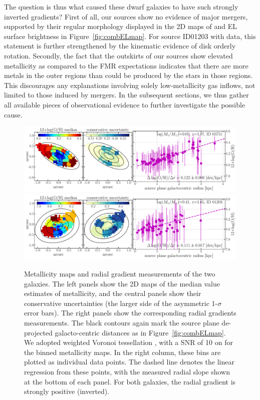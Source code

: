 The question is thus what caused these dwarf galaxies to have such strongly inverted gradients?
First of all, our sources show no evidence of major mergers, supported by their regular morphology displayed in the 2D maps of 
\Mstar and EL surface brightness in Figure~\ref{fig:combELmap}.
For source ID01203 with \osiris data, this statement is further strengthened by the kinematic evidence of disk orderly rotation.
Secondly, the fact that the outskirts of our sources show elevated metallicity as compared to the FMR 
expectations indicates that there are more metals in the outer regions than could be produced by the stars in those 
regions.
This discourages any explanations involving solely low-metallicity gas inflows, not limited to those induced by mergers.
In the subsequent sections, we thus gather all available pieces of observational evidence to further investigate the possible 
cause.

\begin{figure}
    \centering
    \includegraphics[width=\textwidth]{fig/metalgrad_ID03751.pdf}\\
    \includegraphics[width=\textwidth]{fig/metalgrad_ID01203.pdf}
    \caption[Metallicity maps and radial gradient measurements of the two galaxies.]
    {Metallicity maps and radial gradient measurements of the two galaxies. The left panels show the 2D maps of the median
    value estimates of metallicity, and the central panels show their conservative uncertainties (\ie the larger side of the
    asymmetric 1-$\sigma$ error bars). The right panels show the corresponding radial gradients measurements.
    The black contours again mark the source plane de-projected galacto-centric distances as in 
    Figure~\ref{fig:combELmap}.
    We adopted weighted Voronoi tessellation \citep{Cappellari:2003eu,Diehl:2006cz},
    with a SNR of 10 on \OIII for the binned metallicity maps.
    In the right column, these bins are plotted as individual data points.
    The dashed line denotes the linear regression from these points, with the measured radial slope shown at the bottom of each
    panel.  For both galaxies, the radial gradient is strongly positive (\ie inverted).
    \label{fig:oh12grad}}
\end{figure}


